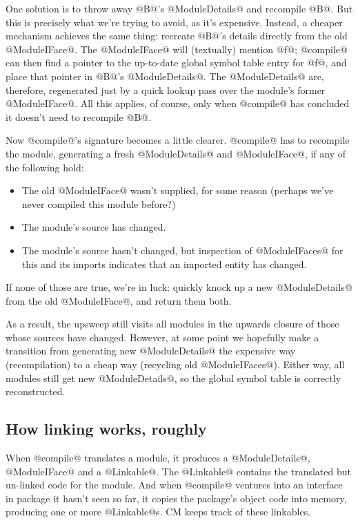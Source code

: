 \documentclass[11pt]{article}
\begin{document}
One solution is to throw away @B@'s @ModuleDetails@ and recompile @B@.
But this is precisely what we're trying to avoid, as it's expensive.
Instead, a cheaper mechanism achieves the same thing: recreate @B@'s
details directly from the old @ModuleIFace@.  The @ModuleIFace@ will
(textually) mention @f@; @compile@ can then find a pointer to the 
up-to-date global symbol table entry for @f@, and place that pointer
in @B@'s @ModuleDetails@.  The @ModuleDetails@ are, therefore,
regenerated just by a quick lookup pass over the module's former
@ModuleIFace@.  All this applies, of course, only when @compile@ has
concluded it doesn't need to recompile @B@.

Now @compile@'s signature becomes a little clearer.  @compile@ has to
recompile the module, generating a fresh @ModuleDetails@ and
@ModuleIFace@, if any of the following hold:
\begin{itemize}
\item
  The old @ModuleIFace@ wasn't supplied, for some reason (perhaps
  we've never compiled this module before?)
\item
  The module's source has changed.
\item
  The module's source hasn't changed, but inspection of @ModuleIFaces@ 
  for this and its imports indicates that an imported entity has
  changed.
\end{itemize}
If none of those are true, we're in luck: quickly knock up a new
@ModuleDetails@ from the old @ModuleIFace@, and return them both.

As a result, the upsweep still visits all modules in the upwards
closure of those whose sources have changed.  However, at some point
we hopefully make a transition from generating new @ModuleDetails@ the
expensive way (recompilation) to a cheap way (recycling old
@ModuleIFaces@).  Either way, all modules still get new
@ModuleDetails@, so the global symbol table is correctly
reconstructed.


\subsection{How linking works, roughly}

When @compile@ translates a module, it produces a @ModuleDetails@,
@ModuleIFace@ and a @Linkable@.  The @Linkable@ contains the
translated but un-linked code for the module.  And when @compile@
ventures into an interface in package it hasn't seen so far, it
copies the package's object code into memory, producing one or more
@Linkable@s.  CM keeps track of these linkables.  
\end{document}
